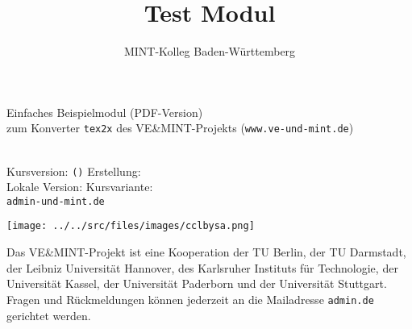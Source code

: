 
\title{Test Modul}
\author{MINT-Kolleg Baden-W\"urttemberg}



\MSetSubject{\MINTMathematics}

\begin{framed}
\begin{center}
\LARGE
Einfaches Beispielmodul (PDF-Version)\\
\large
zum Konverter \texttt{tex2x} des VE\&MINT-Projekts (\texttt{www.ve-und-mint.de})
\end{center}
\ \\

Kursversion:  \texttt{\MSignatureMain (\MSignatureVersion)} 
Erstellung:  \MSignatureDate\\
Lokale Version:  \texttt{\MSignatureLocalization} 
Kursvariante: \texttt{\MSignatureVariant}\\
\scriptsize \texttt{admin\@@ve-und-mint.de}
\end{framed}


\begin{center}
\texttt{[image: ../../src/files/images/cclbysa.png]}
\end{center}


Das VE\&MINT-Projekt ist eine Kooperation der TU Berlin, der TU Darmstadt, der Leibniz Universität Hannover, des Karlsruher
Instituts für Technologie, der Universität Kassel, der Universität Paderborn und der Universität Stuttgart.
Fragen und Rückmeldungen können jederzeit an die Mailadresse \texttt{admin\@@veundmint.de} gerichtet werden.

\Mtableofcontents



\MPrintIndex


